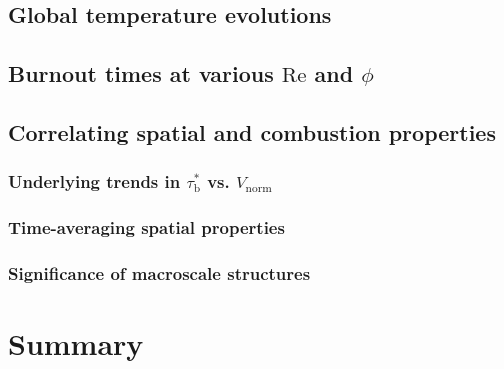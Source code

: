 \subsection{Global temperature evolutions}
\subsection{Burnout times at various $\mathrm{Re}$ and $\phi$}
\subsection{Correlating spatial and combustion properties}
\subsubsection{Underlying trends in $\tau_\mathrm{b}^*$ vs. $V_\mathrm{norm}$}
\subsubsection{Time-averaging spatial properties}
\subsubsection{Significance of macroscale structures}
\section{Summary}